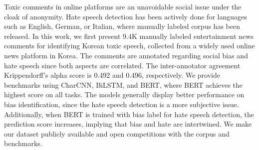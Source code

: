 Toxic comments in online platforms are an unavoidable social issue under the cloak of anonymity. Hate speech detection has been actively done for languages such as English, German, or Italian, where manually labeled corpus has been released. In this work, we first present 9.4K manually labeled entertainment news comments for identifying Korean toxic speech, collected from a widely used online news platform in Korea. The comments are annotated regarding social bias and hate speech since both aspects are correlated. The inter-annotator agreement Krippendorff's alpha score is 0.492 and 0.496, respectively. We provide benchmarks using CharCNN, BiLSTM, and BERT, where BERT achieves the highest score on all tasks. The models generally display better performance on bias identification, since the hate speech detection is a more subjective issue. Additionally, when BERT is trained with bias label for hate speech detection, the prediction score increases, implying that bias and hate are intertwined. We make our dataset publicly available and open competitions with the corpus and benchmarks.
